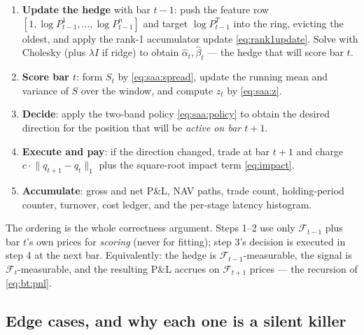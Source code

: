 \begin{enumerate}
  \item \textbf{Update the hedge} with bar $t-1$: push the feature row
    $[1,\log P^{1}_{t-1},\dots,\log P^{n}_{t-1}]$ and target $\log P^{T}_{t-1}$ into the
    ring, evicting the oldest, and apply the rank-1 accumulator update
    \eqref{eq:rank1update}. Solve with Cholesky (plus $\lambda I$ if ridge) to obtain
    $\hat\alpha_{t},\hat\beta_{t}$ --- the hedge that will score bar $t$.
  \item \textbf{Score bar $t$}: form $S_t$ by \eqref{eq:saa:spread}, update the running
    mean and variance of $S$ over the window, and compute $z_t$ by \eqref{eq:saa:z}.
  \item \textbf{Decide}: apply the two-band policy \eqref{eq:saa:policy} to obtain the
    desired direction for the position that will be \emph{active on bar $t+1$}.
  \item \textbf{Execute and pay}: if the direction changed, trade at bar $t+1$ and charge
    $c\cdot\lVert q_{t+1}-q_t\rVert_1$ plus the square-root impact term \eqref{eq:impact}.
  \item \textbf{Accumulate}: gross and net P\&L, NAV paths, trade count, holding-period
    counter, turnover, cost ledger, and the per-stage latency histogram.
\end{enumerate}

The ordering is the whole correctness argument. Steps 1--2 use only
$\mathcal F_{t-1}$ plus bar $t$'s own prices for \emph{scoring} (never for fitting);
step 3's decision is executed in step 4 at the next bar. Equivalently: the hedge is
$\mathcal F_{t-1}$-measurable, the signal is $\mathcal F_t$-measurable, and the resulting
P\&L accrues on $\mathcal F_{t+1}$ prices --- the recursion of \eqref{eq:bt:pnl}.

\subsection{Edge cases, and why each one is a silent killer}

